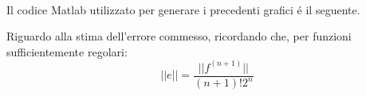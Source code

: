 \\

\noindent Il codice Matlab utilizzato per generare i precedenti grafici \'e il seguente.



\noindent Riguardo alla stima dell'errore commesso, ricordando che, per funzioni sufficientemente regolari:
\[
||e|| = \frac{||f^{(n+1)}||}{(n+1)!2^n}
\]
